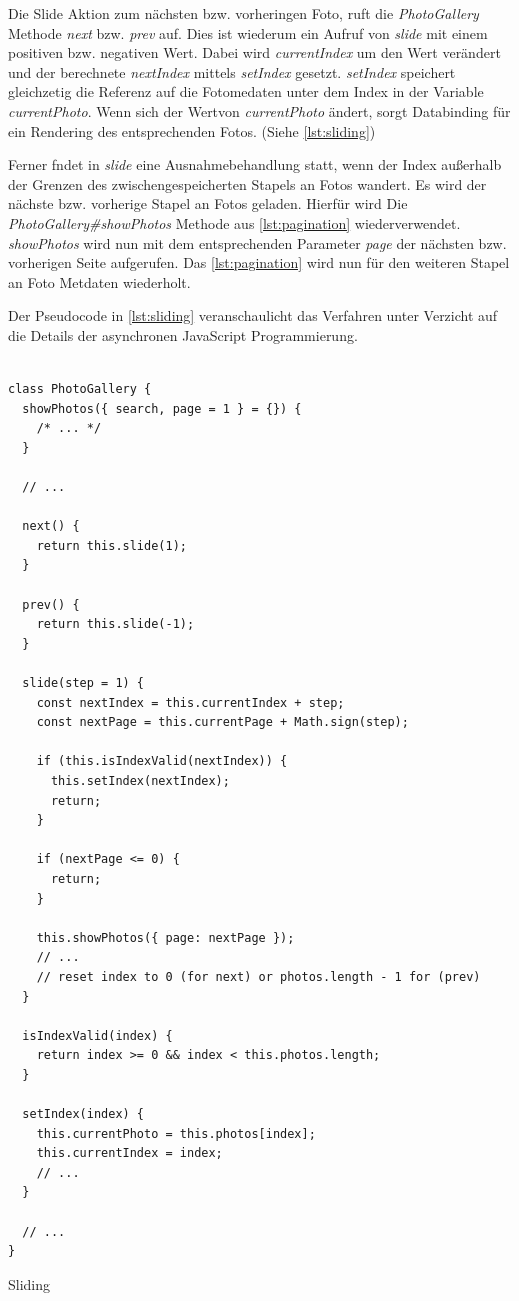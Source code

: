 Die Slide Aktion zum nächsten bzw. vorheringen Foto, ruft die \textit{PhotoGallery} Methode \textit{next} bzw. \textit{prev} auf. Dies ist wiederum ein Aufruf von \textit{slide} mit einem positiven bzw. negativen Wert. Dabei wird \textit{currentIndex} um den Wert verändert und der berechnete \textit{nextIndex} mittels \textit{setIndex} gesetzt. \textit{setIndex} speichert gleichzetig die Referenz auf die Fotomedaten unter dem Index in der Variable \textit{currentPhoto}. Wenn sich der Wertvon \textit{currentPhoto} ändert, sorgt Databinding für ein Rendering des entsprechenden Fotos. (Siehe \ref{lst:sliding})

 Ferner fndet in \textit{slide} eine Ausnahmebehandlung statt, wenn der Index außerhalb der Grenzen des zwischengespeicherten Stapels an Fotos wandert. Es wird der nächste bzw. vorherige Stapel an Fotos geladen. Hierfür wird Die \textit{PhotoGallery\#showPhotos} Methode aus \ref{lst:pagination} wiederverwendet. \textit{showPhotos} wird nun mit dem entsprechenden Parameter \textit{page} der nächsten bzw. vorherigen Seite aufgerufen. Das \ref{lst:pagination} wird nun für den weiteren Stapel an Foto Metdaten wiederholt.


Der Pseudocode in  \ref{lst:sliding} veranschaulicht das Verfahren unter Verzicht auf die Details der asynchronen JavaScript Programmierung.

\begin{listing}[H]
\begin{verbatim}

class PhotoGallery {
  showPhotos({ search, page = 1 } = {}) {
    /* ... */
  }

  // ...

  next() {
    return this.slide(1);
  }

  prev() {
    return this.slide(-1);
  }

  slide(step = 1) {
    const nextIndex = this.currentIndex + step;
    const nextPage = this.currentPage + Math.sign(step);

    if (this.isIndexValid(nextIndex)) {
      this.setIndex(nextIndex);
      return;
    }

    if (nextPage <= 0) {
      return;
    }

    this.showPhotos({ page: nextPage });
    // ...
    // reset index to 0 (for next) or photos.length - 1 for (prev)
  }

  isIndexValid(index) {
    return index >= 0 && index < this.photos.length;
  }

  setIndex(index) {
    this.currentPhoto = this.photos[index];
    this.currentIndex = index;
    // ...
  }

  // ...
}

\end{verbatim}
\caption{Sliding}
\label{lst:sliding}
\end{listing}
